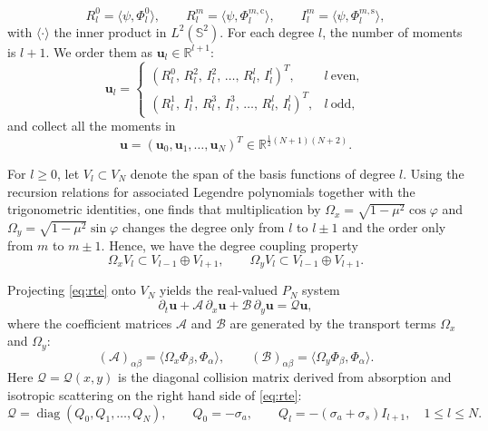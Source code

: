 \documentclass[11pt]{article}
\numberwithin{equation}{section}
\newcommand{\vect}[1]{\boldsymbol{#1}}
\newcommand{\diag}{\operatorname{diag}}
\begin{document}
\begin{equation}
R_l^0 = \langle \psi,\Phi_l^0\rangle,
\qquad
R_l^m = \langle \psi,\Phi_l^{m,\mathrm c}\rangle,
\qquad
I_l^m = \langle \psi,\Phi_l^{m,\mathrm s}\rangle,
\end{equation}
with $\langle \cdot \rangle$ the inner product in $L^2(\mathbb S^2)$.
For each degree $l$, the number of moments is $l+1$. We order them as $\vect{u}_l\in\mathbb R^{l+1}$:
\begin{equation}
\vect{u}_l=
\begin{cases}
(R_l^0,\,R_l^2,\,I_l^2,\,\dots,\,R_l^l,\,I_l^l)^T, & l\ \text{even},\\[0.3em]
(R_l^1,\,I_l^1,\,R_l^3,\,I_l^3,\,\dots,\,R_l^l,\,I_l^l)^T, & l\ \text{odd},
\end{cases}
\end{equation}
and collect all the moments in
\begin{equation}
\vect{u}=(\vect{u}_0,\vect{u}_1,\dots,\vect{u}_N)^T\in\mathbb R^{\frac{1}{2}(N+1)(N+2)}.
\end{equation}

For $l\ge 0$, let $V_l\subset V_N$ denote the span of the basis functions of degree $l$. Using the recursion relations for associated Legendre polynomials together with the trigonometric identities,
one finds that multiplication by $\Omega_x=\sqrt{1-\mu^2}\cos\varphi$ and $\Omega_y=\sqrt{1-\mu^2}\sin\varphi$ changes the degree only from $l$ to $l\pm1$ and the order only from $m$ to $m\pm1$. Hence, we have the degree coupling property
\begin{equation}\label{eq:degree-coupling}
\Omega_x V_l \subset V_{l-1}\oplus V_{l+1},
\qquad
\Omega_y V_l \subset V_{l-1}\oplus V_{l+1}.
\end{equation}

Projecting \eqref{eq:rte} onto $V_N$ yields the real-valued $P_N$ system
\begin{equation}\label{eq:real-pn}
    \partial_t \vect{u} + \mathcal{A} \, \partial_x\vect{u} + \mathcal{B} \, \partial_y\vect{u} = \mathcal{Q}\vect{u},
\end{equation}
where the coefficient matrices $\mathcal{A}$ and $\mathcal{B}$ are generated by the transport terms $\Omega_x$ and $\Omega_y$: 
\begin{equation}\label{eq:coefficient-matrices-def}
(\mathcal{A})_{\alpha\beta}=\langle \Omega_x\Phi_\beta,\Phi_\alpha\rangle,
\qquad
(\mathcal{B})_{\alpha\beta}=\langle \Omega_y\Phi_\beta,\Phi_\alpha\rangle.
\end{equation}
Here $\mathcal{Q}=\mathcal{Q}(x,y)$ is the diagonal collision matrix derived from absorption and isotropic scattering on the right hand side of \eqref{eq:rte}:
\begin{equation}\label{eq:collision-matrix}
\mathcal{Q}=\diag(Q_0,Q_1,\dots,Q_N),
\qquad
Q_0=-\sigma_a,
\qquad
Q_l=-(\sigma_a+\sigma_s)I_{l+1}, \quad 1\le l\le N.
\end{equation}
\end{document}

